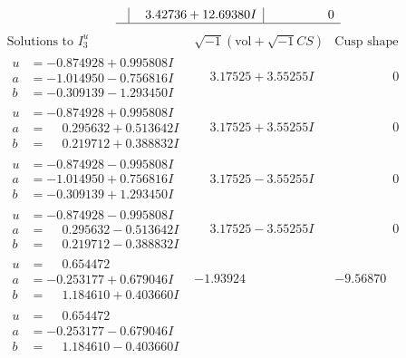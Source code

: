 \documentclass[1p]{elsarticle_modified}
\theoremstyle{definition}
\newcommand{\I}{\sqrt{-1}}
\begin{document}
$$\begin{array}{c|c|c}
 & \phantom{-}3.42736 + 12.69380 I & \phantom{-0.000000 } 0\\
 \hline 
 \end{array}$$\newpage$$\begin{array}{c|c|c}  
\text{Solutions to }I^u_{3}& \I (\text{vol} + \sqrt{-1}CS) & \text{Cusp shape}\\
 \hline 
\begin{aligned}
u &= -0.874928 + 0.995808 I \\
a &= -1.014950 - 0.756816 I \\
b &= -0.309139 - 1.293450 I\end{aligned}
 & \phantom{-}3.17525 + 3.55255 I & \phantom{-0.000000 } 0 \\ \hline\begin{aligned}
u &= -0.874928 + 0.995808 I \\
a &= \phantom{-}0.295632 + 0.513642 I \\
b &= \phantom{-}0.219712 + 0.388832 I\end{aligned}
 & \phantom{-}3.17525 + 3.55255 I & \phantom{-0.000000 } 0 \\ \hline\begin{aligned}
u &= -0.874928 - 0.995808 I \\
a &= -1.014950 + 0.756816 I \\
b &= -0.309139 + 1.293450 I\end{aligned}
 & \phantom{-}3.17525 - 3.55255 I & \phantom{-0.000000 } 0 \\ \hline\begin{aligned}
u &= -0.874928 - 0.995808 I \\
a &= \phantom{-}0.295632 - 0.513642 I \\
b &= \phantom{-}0.219712 - 0.388832 I\end{aligned}
 & \phantom{-}3.17525 - 3.55255 I & \phantom{-0.000000 } 0 \\ \hline\begin{aligned}
u &= \phantom{-}0.654472\phantom{ +0.000000I} \\
a &= -0.253177 + 0.679046 I \\
b &= \phantom{-}1.184610 + 0.403660 I\end{aligned}
 & -1.93924\phantom{ +0.000000I} & -9.56870\phantom{ +0.000000I} \\ \hline\begin{aligned}
u &= \phantom{-}0.654472\phantom{ +0.000000I} \\
a &= -0.253177 - 0.679046 I \\
b &= \phantom{-}1.184610 - 0.403660 I\end{aligned}

\end{array}$$
\end{document}
